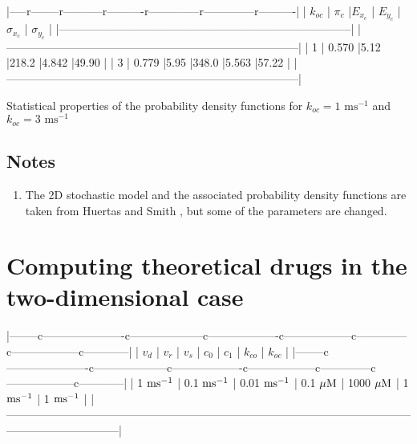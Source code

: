 {|-----r--------r-----------r----------r--------------r--------------r----------|
| $k_{oc}$ | $\pi_c$ |$E_{x_c}$ | $E_{y_c}$ | $\sigma_{x_c}$ | $\sigma_{y_c}$  |
|------------------------------------------------------------------------------|
|------------------------------------------------------------------------------|
| 1        | 0.570   |5.12      |218.2     |4.842           |49.90             |
| 3        | 0.779   |5.95      |348.0     |5.563           |57.22             |
|------------------------------------------------------------------------------|

Statistical properties of the probability density functions 
for $k_{oc}=1 \text{ ms}^{-1}$ and  $k_{oc}=3 \text{ ms}^{-1}$



\section{Notes}

\begin{enumerate}
\item The 2D stochastic model and the associated probability density functions are taken from Huertas and Smith \cite{Huertas2007}, but some of the parameters are changed.
\end{enumerate}

\chapter{Computing theoretical drugs in the two-dimensional case}
\label{comptheo2d}
|--------c----------------------c--------------------c-------------------c------------------c--------------c------------------c------------|
| $v_d$            | $v_r$              | $v_s$               | $c_0$            | $c_1$             | $k_{co}$         | $k_{oc}$         |
|--------c----------------------c--------------------c-------------------c------------------c--------------c------------------c------------|
| 1 $\rm{ms^{-1}}$ | 0.1 $\rm{ms^{-1}}$ | 0.01 $\rm{ms^{-1}}$ | 0.1 $\rm{\mu M}$ | 1000 $\rm{\mu M}$ | 1 $\rm{ms^{-1}}$ | 1 $\rm{ms^{-1}}$ |
|------------------------------------------------------------------------------------------------------------------------------------------|

}

